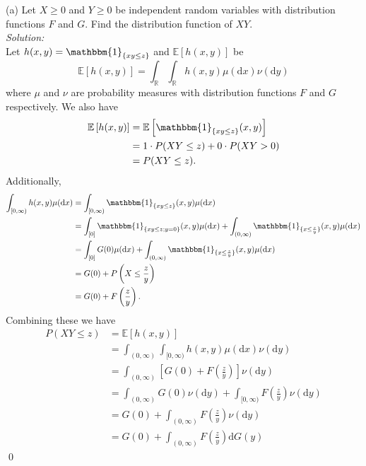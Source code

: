 \documentclass[10pt]{amsart}
\newcommand{\D}{\mathrm{d}}
\begin{document}
  (a) Let $X \geq 0$ and $Y \geq 0$  be independent random variables with distribution functions $F$ and $G$. Find the distribution function of $XY$. \\
\textit{Solution:} \\
Let $h(x, y) = \mathbbm{1}_{\{xy \leq z\}}$ and $\mathbb E \left[ h(x,y) \right]$ be
$$
\mathbb E \left[ h(x,y) \right] = \int_{\mathbb R} \int_{\mathbb R} h(x, y) \mu(\D x) \nu(\D y)
$$
where $\mu$ and $\nu$ are probability measures with distribution functions $F$ and $G$ respectively.
We also have 
\begin{align*}
\mathbb E \left[ h(x,y) \right]
	&= \mathbb E \left[ \mathbbm{1}_{\{xy \leq z\}}(x, y) \right] \\
	&= 1 \cdot P(XY \leq z) + 0 \cdot P(XY > 0) \\
	&= P(XY \leq z).
\end{align*}
Additionally,
\begin{align*}
\int_{[0,\infty)} h(x, y) \mu(\D x) 
	&= \int_{[0,\infty)} \mathbbm{1}_{\{xy \leq z\}}(x, y) \mu(\D x) \\
	&= \int_{[0]} \mathbbm{1}_{\{xy \leq z; y=0\}}(x, y) \mu(\D x) + \int_{(0, \infty)} \mathbbm{1}_{\{x \leq \frac z y\}}(x, y) \mu(\D x) \\
	&= \int_{[0]} G(0) \mu(\D x) + \int_{(0, \infty)} \mathbbm{1}_{\{x \leq \frac z y\}}(x, y) \mu(\D x) \\
	&= G(0) + P\left( X \leq \frac z y \right) \\
	&= G(0) + F\left(\frac z y \right).
\end{align*}
Combining these we have
\begin{align*}
P\left( XY \leq z \right)
	&= \mathbb E \left[ h(x,y) \right] \\
	&= \int_{(0, \infty)} \int_{[0, \infty)} h(x, y) \mu(\D x) \nu(\D y) \\
	&= \int_{(0, \infty)} \left[G(0) + F\left(\frac z y \right) \right]\nu(\D y) \\
	&= \int_{(0, \infty)} G(0) \nu(\D y) + \int_{[0, \infty)}F\left(\frac z y \right) \nu(\D y) \\
	&= G(0) + \int_{(0, \infty)}F\left(\frac z y \right) \nu(\D y) \\
	&= G(0) + \int_{(0, \infty)} F\left(\frac z y \right) \D G(y)
\end{align*}
\qed \\
\end{document}
